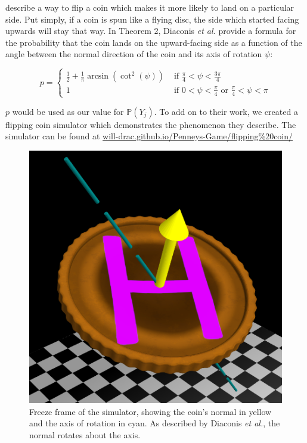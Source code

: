 \documentclass[english,12pt,a4paper,final]{article}
\begin{document}
\textcite{unfairCoin} describe a way to flip a coin which makes it more likely to land on a particular side. Put simply, if a coin is spun like a flying disc, the side which started facing upwards will stay that way. In Theorem 2, Diaconis \textit{et al.} provide a formula for the probability that the coin lands on the upward-facing side as a function of the angle between the normal direction of the coin and its axis of rotation $\psi$:

\begin{equation}\label{coinProbByAngle}
	p = \begin{cases}
		\frac{1}{2} + \frac{1}{\pi}\arcsin(\cot^2(\psi)) & \text{ if } \frac{\pi}{4}<\psi<\frac{3\pi}{4}
		\\
		1 & \text{ if } 0<\psi<\frac{\pi}{4} \text{ or } \frac{\pi}{4} < \psi < \pi
	\end{cases}
\end{equation}

$p$ would be used as our value for $\mathbb{P}(Y_j)$. To add on to their work, we created a flipping coin simulator which demonstrates the phenomenon they describe. The simulator can be found at \href{https://will-drac.github.io/Penneys-Game/flipping%20coin/}{will-drac.github.io/Penneys-Game/flipping\%20coin/}

\begin{figure}[H]
	\centering
	\includegraphics[width=0.7\linewidth]{flippingCoin}
	\caption{Freeze frame of the simulator, showing the coin's normal in yellow and the axis of rotation in cyan. As described by Diaconis \textit{et al.}, the normal rotates about the axis.}
	\label{fig:flippingcoin}
\end{figure}
\end{document}
